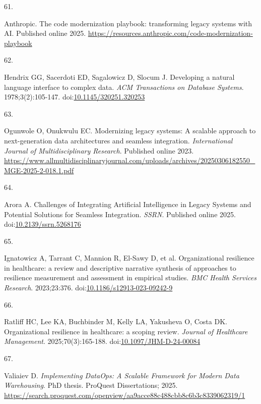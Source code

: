 \documentclass[
  american,
  11pt,
  letterpaper,
  oneside  ,captions=tableheading
]{scrartcl}
\newlength{\cslhangindent}
\newlength{\csllabelwidth}
\newenvironment{CSLReferences}[2] %
 {\begin{list}{}{%
  \setlength{\itemindent}{0pt}
  \setlength{\leftmargin}{0pt}
  \setlength{\parsep}{0pt}
  \ifodd #1
   \setlength{\leftmargin}{\cslhangindent}
   \setlength{\itemindent}{-1\cslhangindent}
  \fi
  \setlength{\itemsep}{#2\baselineskip}}}
 {\end{list}}
\newcommand{\CSLLeftMargin}[1]{\parbox[t]{\csllabelwidth}{\strut#1\strut}}
\newcommand{\CSLRightInline}[1]{\parbox[t]{\linewidth - \csllabelwidth}{\strut#1\strut}}
\begin{document}
\begin{CSLReferences}{0}{1}
\CSLLeftMargin{61. }%
\CSLRightInline{Anthropic. {The code modernization playbook:
transforming legacy systems with {AI}}. Published online 2025.
\url{https://resources.anthropic.com/code-modernization-playbook}}

\CSLLeftMargin{62. }%
\CSLRightInline{Hendrix GG, Sacerdoti ED, Sagalowicz D, Slocum J.
{Developing a natural language interface to complex data}. \emph{{ACM}
Transactions on Database Systems}. 1978;3(2):105-147.
doi:\href{https://doi.org/10.1145/320251.320253}{10.1145/320251.320253}}

\CSLLeftMargin{63. }%
\CSLRightInline{Ogunwole O, Onukwulu EC. {Modernizing legacy systems: A
scalable approach to next-generation data architectures and seamless
integration}. \emph{International Journal of Multidisciplinary
Research}. Published online 2023.
\url{https://www.allmultidisciplinaryjournal.com/uploads/archives/20250306182550_MGE-2025-2-018.1.pdf}}

\CSLLeftMargin{64. }%
\CSLRightInline{Arora A. {Challenges of Integrating Artificial
Intelligence in Legacy Systems and Potential Solutions for Seamless
Integration}. \emph{{SSRN}}. Published online 2025.
doi:\href{https://doi.org/10.2139/ssrn.5268176}{10.2139/ssrn.5268176}}

\CSLLeftMargin{65. }%
\CSLRightInline{{Ignatowicz A, Tarrant C, Mannion R, El-Sawy D, et al.}
{Organizational resilience in healthcare: a review and descriptive
narrative synthesis of approaches to resilience measurement and
assessment in empirical studies}. \emph{BMC Health Services Research}.
2023;23:376.
doi:\href{https://doi.org/10.1186/s12913-023-09242-9}{10.1186/s12913-023-09242-9}}

\CSLLeftMargin{66. }%
\CSLRightInline{Ratliff HC, Lee KA, Buchbinder M, Kelly LA, Yakusheva O,
Costa DK. {Organizational resilience in healthcare: a scoping review}.
\emph{Journal of Healthcare Management}. 2025;70(3):165-188.
doi:\href{https://doi.org/10.1097/JHM-D-24-00084}{10.1097/JHM-D-24-00084}}

\CSLLeftMargin{67. }%
\CSLRightInline{Valiaiev D. \emph{{Implementing DataOps: A Scalable
Framework for Modern Data Warehousing}}. PhD thesis. ProQuest
Dissertations; 2025.
\url{https://search.proquest.com/openview/aa9acce88c488cbb8c6b3c8339062319/1}}


\end{CSLReferences}
\end{document}
